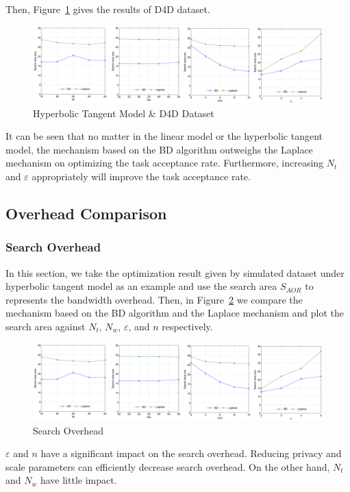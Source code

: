Then, Figure~\ref{img:TanhD4D} gives the results of D4D dataset.

\begin{figure}
\includegraphics[width=1\textwidth]{TanhD4D}
\caption{Hyperbolic Tangent Model \& D4D Dataset}
\label{img:TanhD4D}
\end{figure}

It can be seen that no matter in the linear model or the hyperbolic tangent model, the mechanism based on the BD algorithm outweighs the Laplace mechanism on optimizing the task acceptance rate. Furthermore, increasing $N_t$ and $\varepsilon$ appropriately will improve the task acceptance rate.

\subsection{Overhead Comparison} %
\subsubsection{Search Overhead}
In this section, we take the optimization result given by simulated dataset under hyperbolic tangent model as an example and use the search area $S_{AOR}$ to represents the bandwidth overhead. Then, in Figure~\ref{img:SAOR} we compare the mechanism based on the BD algorithm and the Laplace mechanism and plot the search area against $N_t$, $N_w$, $\varepsilon$, and $n$ respectively.

\begin{figure}
\includegraphics[width=1\textwidth]{SAOR}
\caption{Search Overhead}
\label{img:SAOR}
\end{figure}

$\varepsilon$ and $n$ have a significant impact on the search overhead. Reducing privacy and scale parameters can efficiently decrease search overhead. On the other hand, $N_t$ and $N_w$ have little impact.

